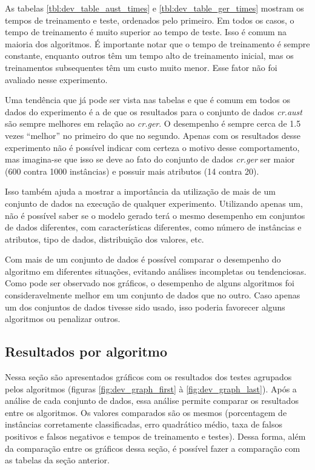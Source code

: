 As tabelas \ref{tbl:dev_table_aust_times} e \ref{tbl:dev_table_ger_times} mostram os tempos de treinamento e teste, ordenados pelo primeiro. Em todos os casos, o tempo de treinamento é muito superior ao tempo de teste. Isso é comum na maioria dos algoritmos. É importante notar que o tempo de treinamento é sempre constante, enquanto outros têm um tempo alto de treinamento inicial, mas os treinamentos subsequentes têm um custo muito menor. Esse fator não foi avaliado nesse experimento.

Uma tendência que já pode ser vista nas tabelas e que é comum em todos os dados do experimento é a de que os resultados para o conjunto de dados \emph{cr.aust} são sempre melhores em relação ao \emph{cr.ger}. O desempenho é sempre cerca de 1.5 vezes ``melhor'' no primeiro do que no segundo. Apenas com os resultados desse experimento não é possível indicar com certeza o motivo desse comportamento, mas imagina-se que isso se deve ao fato do conjunto de dados \emph{cr.ger} ser maior (600 contra 1000 instâncias) e possuir mais atributos (14 contra 20).

Isso também ajuda a mostrar a importância da utilização de mais de um conjunto de dados na execução de qualquer experimento. Utilizando apenas um, não é possível saber se o modelo gerado terá o mesmo desempenho em conjuntos de dados diferentes, com características diferentes, como número de instâncias e atributos, tipo de dados, distribuição dos valores, etc.

Com mais de um conjunto de dados é possível comparar o desempenho do algoritmo em diferentes situações, evitando análises incompletas ou tendenciosas. Como pode ser observado nos gráficos, o desempenho de alguns algoritmos foi consideravelmente melhor em um conjunto de dados que no outro. Caso apenas um dos conjuntos de dados tivesse sido usado, isso poderia favorecer alguns algoritmos ou penalizar outros.

\subsection{Resultados por algoritmo}

Nessa seção são apresentados gráficos com os resultados dos testes agrupados pelos algoritmos (figuras \ref{fig:dev_graph_first} à \ref{fig:dev_graph_last}). Após a análise de cada conjunto de dados, essa análise permite comparar os resultados entre os algoritmos. Os valores comparados são os mesmos (porcentagem de instâncias corretamente classificadas, erro quadrático médio, taxa de falsos positivos e falsos negativos e tempos de treinamento e testes). Dessa forma, além da comparação entre os gráficos dessa seção, é possível fazer a comparação com as tabelas da seção anterior.

